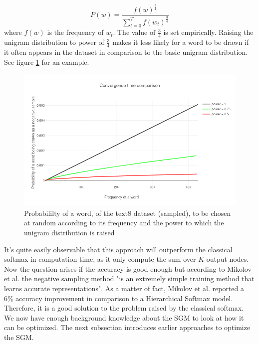 \begin{equation} \label{eq:unigram}
P(w)=\frac{f(w)^{\frac{3}{4}}}{\sum_{t=0}^{T} f(w_t)^{\frac{3}{4}}}
\end{equation}
where $f(w)$ is the frequency of $w_t$. The value of $\frac{3}{4}$ is set empirically. Raising the unigram distribution to power of $\frac{3}{4}$ makes it less likely for a word to be drawn if it often appears in the dataset in comparison to the basic unigram distribution. See figure \ref{fig:frequency_ex} for an example.
\begin{figure}[ht]
\centering
\includegraphics[scale=0.45]{images/frequency_ex}
\caption{Probabililty of a word, of the text8 dataset (sampled), to be chosen at random according to its frequency and the power to which the unigram distribution is raised}
\label{fig:frequency_ex}
\end{figure}
It's quite easily observable that this approach will outperform the classical softmax in computation time, as it only compute the sum over $K$ output nodes. Now the question arises if the accuracy is good enough but according to Mikolov et al. \cite{mikolov2} the negative sampling method "is an extremely simple training method that learns accurate representations". As a matter of fact, Mikolov et al. \cite{mikolov2} reported a 6\% accuracy improvement in comparison to a Hierarchical Softmax model. Therefore, it is a good solution to the problem raised by the classical softmax.
We now have enough background knowledge about the SGM to look at how it can be optimized. The next subsection introduces earlier approaches to optimize the SGM.